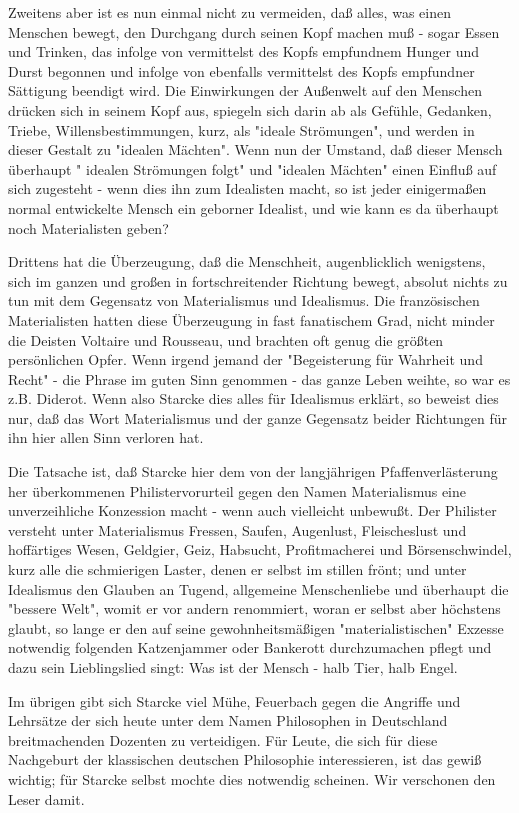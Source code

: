Zweitens aber ist es nun einmal nicht zu vermeiden, daß alles,
was einen Menschen bewegt, den Durchgang durch seinen Kopf machen muß -
sogar Essen und Trinken, das infolge von vermittelst des Kopfs
empfundnem  Hunger und Durst begonnen und infolge von ebenfalls
vermittelst des Kopfs empfundner Sättigung beendigt wird. Die
Einwirkungen der Außenwelt auf den Menschen drücken sich in seinem Kopf
aus, spiegeln sich darin ab als Gefühle, Gedanken, Triebe,
Willensbestimmungen, kurz, als "ideale Strömungen", und werden in dieser
Gestalt zu "idealen Mächten". Wenn nun der Umstand, daß dieser Mensch
überhaupt " idealen Strömungen folgt" und "idealen Mächten" einen
Einfluß auf sich zugesteht - wenn dies ihn zum Idealisten macht, so ist
jeder einigermaßen normal entwickelte Mensch ein geborner Idealist, und
wie kann es da überhaupt noch Materialisten geben?

Drittens hat die Überzeugung, daß die Menschheit, augenblicklich
wenigstens, sich im ganzen und großen in fortschreitender Richtung
bewegt, absolut nichts zu tun mit dem Gegensatz von Materialismus und
Idealismus. Die französischen Materialisten hatten diese Überzeugung in
fast fanatischem Grad, nicht minder die Deisten Voltaire und Rousseau,
und brachten oft genug die größten persönlichen Opfer. Wenn irgend
jemand der "Begeisterung für Wahrheit und Recht" - die Phrase im guten
Sinn genommen - das ganze Leben weihte, so war es z.B. Diderot. Wenn
also Starcke dies alles für Idealismus erklärt, so beweist dies nur, daß
das Wort Materialismus und der ganze Gegensatz beider Richtungen für ihn
hier allen Sinn verloren hat.

Die Tatsache ist, daß Starcke hier dem von der langjährigen
Pfaffenverlästerung her überkommenen Philistervorurteil gegen den Namen
Materialismus eine unverzeihliche Konzession macht - wenn auch
vielleicht unbewußt. Der Philister versteht unter Materialismus Fressen,
Saufen, Augenlust, Fleischeslust und hoffärtiges Wesen, Geldgier, Geiz,
Habsucht, Profitmacherei und Börsenschwindel, kurz alle die schmierigen
Laster, denen er selbst im stillen frönt; und unter Idealismus den
Glauben an Tugend, allgemeine Menschenliebe und überhaupt die "bessere
Welt", womit er vor andern renommiert, woran er selbst aber höchstens
glaubt, so lange er den auf seine gewohnheitsmäßigen "materialistischen"
Exzesse notwendig folgenden Katzenjammer oder Bankerott durchzumachen
pflegt und dazu sein Lieblingslied singt: Was ist der Mensch - halb
Tier, halb Engel.

Im übrigen gibt sich Starcke viel Mühe, Feuerbach gegen die
Angriffe und Lehrsätze der sich heute unter dem Namen Philosophen in
Deutschland breitmachenden Dozenten zu verteidigen. Für Leute, die sich
für diese Nachgeburt der klassischen deutschen Philosophie
interessieren, ist das gewiß wichtig; für Starcke selbst mochte dies
notwendig scheinen. Wir verschonen den Leser damit.


